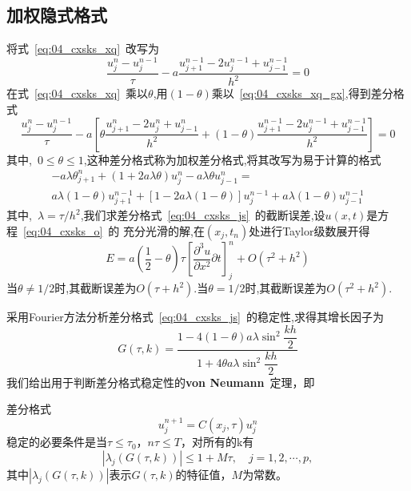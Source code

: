 \subsection{加权隐式格式}
将式~\eqref{eq:04_cxsks_xq}~改写为
\begin{equation}\label{eq:04_cxsks_xq_gx}
 \dfrac{u_j^n-u_j^{n-1}}{\tau}-a\dfrac{u_{j+1}^{n-1}-2u_{j}^{n-1}+u_{j-1}^{n-1}}{h^2}=0
\end{equation}
在式~\eqref{eq:04_cxsks_xq}~乘以$\theta$,用$(1-\theta)$乘以~\eqref{eq:04_cxsks_xq_gx},得到差分格式
\begin{equation}\label{eq:04_cxsks_js}
 \dfrac{u_j^n-u_j^{n-1}}{\tau}-a\left[\theta\dfrac{u_{j+1}^n-2u_j^n+u_{j-1}^n}{h^2}
 +(1-\theta)\dfrac{u_{j+1}^{n-1}-2u_j^{n-1}+u_{j-1}^{n-1}}{h^2}\right]=0
\end{equation}
其中,~$0\leq\theta\leq 1$,这种差分格式称为加权差分格式,将其改写为易于计算的格式
\begin{multline}
 -a\lambda\theta_{j+1}^n+(1+2a\lambda\theta)u_j^n-a\lambda\theta u_{j-1}^n = \\
 a\lambda(1-\theta)u_{j+1}^{n-1}+[1-2a\lambda(1-\theta)]u_j^{n-1}+a\lambda(1-\theta)u_{j-1}^{n-1}
\end{multline}
其中,~$\lambda=\tau/h^2$,我们求差分格式~\eqref{eq:04_cxsks_js}~的截断误差,设$u(x,t)$是方程~\eqref{eq:04_cxsks_o}~的
充分光滑的解,在$(x_j,t_n)$处进行Taylor级数展开得
\begin{equation*}
E=a\left(\dfrac{1}{2}-\theta\right)\tau\left[\dfrac{\partial^3 u}{\partial x^2}{\partial t}\right]_j^n
+O(\tau^2+h^2)
\end{equation*}
当$\theta\not=1/2$时,其截断误差为$O(\tau+h^2)$.当$\theta=1/2$时,其截断误差为$O(\tau^2+h^2)$.\par
采用Fourier方法分析差分格式~\eqref{eq:04_cxsks_js}~的稳定性,求得其增长因子为
\begin{equation}
 G(\tau,k)=\dfrac{1-4(1-\theta)a\lambda\sin^2\dfrac{kh}{2}}{1+4\theta a\lambda\sin^2\dfrac{kh}{2}}
\end{equation}
我们给出用于判断差分格式稳定性的\textbf{von Neumann}~定理，即
\begin{Theorem}
差分格式
\begin{equation}
	u^{n+1}_j=C(x_j,\tau)u^n_j
\end{equation}
稳定的必要条件是当$\tau\leq\tau_0$，$n\tau\leq T$，对所有的k有
\begin{equation}
	\left|\lambda_j(G(\tau,k))\right| \leq 1+M\tau,\quad j=1,2,\cdots,p,
\end{equation}
其中$\left|\lambda_j(G(\tau,k))\right|$表示$G(\tau,k)$的特征值，$M$为常数。
\end{Theorem}\par
